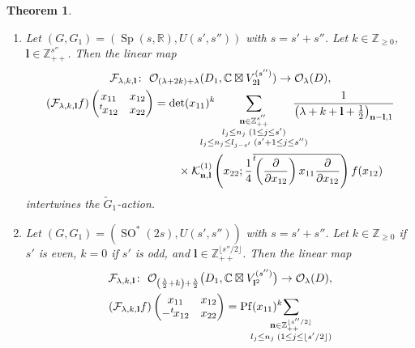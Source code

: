 \documentclass[pdftex]{sigma}
\numberwithin{equation}{section}
\newtheorem{Theorem}{Theorem}[section]
\newcommand{\bl}{\mathbf{l}}
\newcommand{\bn}{\mathbf{n}}
\newcommand{\BZ}{\mathbb{Z}}
\newcommand{\BR}{\mathbb{R}}
\newcommand{\BC}{\mathbb{C}}
\newcommand{\cF}{\mathcal{F}}
\newcommand{\cK}{\mathcal{K}}
\newcommand{\cO}{\mathcal{O}}
\newcommand{\Pf}{\operatorname{Pf}}
\begin{document}
\begin{Theorem}\label{main2}\quad
\begin{enumerate}\itemsep=0pt
\item[$(1)$] Let $(G,G_1)=(\operatorname{Sp}(s,\BR), U(s',s''))$ with $s=s'+s''$. Let $k\in\BZ_{\ge 0}$, $\bl\in\BZ_{++}^{s''}$.
Then the linear map
\begin{gather*}
\cF_{\lambda,k,\bl}\colon \ \cO_{(\lambda+2k)+\lambda}(D_1,\BC\boxtimes V_{2\bl}^{(s'')})\to \cO_\lambda(D), \\
(\cF_{\lambda,k,\bl}f)\begin{pmatrix}x_{11}&x_{12}\\{}^t\hspace{-1pt}x_{12}&x_{22}\end{pmatrix}
=\det(x_{11})^k\hspace{-15pt}\sum_{\substack{\bn\in\BZ_{++}^{s''}\\ l_j\le n_j\; (1\le j\le s') \\
l_j\le n_j\le l_{j-s'}\; (s'+1\le j\le s'')}}\hspace{-15pt}
\frac{1}{\left(\lambda+k+\bl+\frac{1}{2}\right)_{\bn-\bl,1}}\\
\hphantom{(\cF_{\lambda,k,\bl}f)\begin{pmatrix}x_{11}&x_{12}\\{}^t\hspace{-1pt}x_{12}&x_{22}\end{pmatrix}=}{} \times \cK_{\bn,\bl}^{(1)}\left(x_{22};\frac{1}{4}\overline{{\vphantom{\biggl(}}^t\!\!\left(
\frac{\partial}{\partial x_{12}}\right)x_{11}\frac{\partial}{\partial x_{12}}}\right)f(x_{12})
\end{gather*}
intertwines the $\tilde{G}_1$-action.
\item[$(2)$] Let $(G,G_1)=(\operatorname{SO}^*(2s), U(s',s''))$ with $s=s'+s''$.
Let $k\in\BZ_{\ge 0}$ if $s'$ is even, $k=0$ if $s'$ is odd, and $\bl\in\BZ_{++}^{\lfloor s''/2\rfloor}$. Then the linear map
\begin{gather*}
\cF_{\lambda,k,\bl}\colon \ \cO_{\left(\frac{\lambda}{2}+k\right)+\frac{\lambda}{2}}\big(D_1,\BC\boxtimes V_{\bl^2}^{(s'')}\big)
\to \cO_\lambda(D), \\
(\cF_{\lambda,k,\bl}f)\begin{pmatrix}x_{11}&x_{12}\\-{}^t\hspace{-1pt}x_{12}&x_{22}\end{pmatrix}
=\Pf(x_{11})^k\hspace{-30pt}\sum_{\substack{\bn\in\BZ_{++}^{\lfloor s''/2\rfloor}\\ l_j\le n_j\; (1\le j\le \lfloor s'/2\rfloor) \\
}}
\end{gather*}
\end{enumerate}
\end{Theorem}
\end{document}
